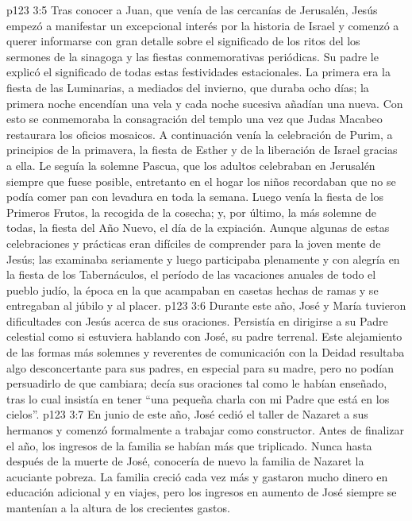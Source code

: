\vs p123 3:5 \pc Tras conocer a Juan, que venía de las cercanías de Jerusalén, Jesús empezó a manifestar un excepcional interés por la historia de Israel y comenzó a querer informarse con gran detalle sobre el significado de los ritos del  los sermones de la sinagoga y las fiestas conmemorativas periódicas. Su padre le explicó el significado de todas estas festividades estacionales. La primera era la fiesta de las Luminarias, a mediados del invierno, que duraba ocho días; la primera noche encendían una vela y cada noche sucesiva añadían una nueva. Con esto se conmemoraba la consagración del templo una vez que Judas Macabeo restaurara los oficios mosaicos. A continuación venía la celebración de Purim, a principios de la primavera, la fiesta de Esther y de la liberación de Israel gracias a ella. Le seguía la solemne Pascua, que los adultos celebraban en Jerusalén siempre que fuese posible, entretanto en el hogar los niños recordaban que no se podía comer pan con levadura en toda la semana. Luego venía la fiesta de los Primeros Frutos, la recogida de la cosecha; y, por último, la más solemne de todas, la fiesta del Año Nuevo, el día de la expiación. Aunque algunas de estas celebraciones y prácticas eran difíciles de comprender para la joven mente de Jesús; las examinaba seriamente y luego participaba plenamente y con alegría en la fiesta de los Tabernáculos, el período de las vacaciones anuales de todo el pueblo judío, la época en la que acampaban en casetas hechas de ramas y se entregaban al júbilo y al placer.
\vs p123 3:6 \pc Durante este año, José y María tuvieron dificultades con Jesús acerca de sus oraciones. Persistía en dirigirse a su Padre celestial como si estuviera hablando con José, su padre terrenal. Este alejamiento de las formas más solemnes y reverentes de comunicación con la Deidad resultaba algo desconcertante para sus padres, en especial para su madre, pero no podían persuadirlo de que cambiara; decía sus oraciones tal como le habían enseñado, tras lo cual insistía en tener “una pequeña charla con mi Padre que está en los cielos”.
\vs p123 3:7 En junio de este año, José cedió el taller de Nazaret a sus hermanos y comenzó formalmente a trabajar como constructor. Antes de finalizar el año, los ingresos de la familia se habían más que triplicado. Nunca hasta después de la muerte de José, conocería de nuevo la familia de Nazaret la acuciante pobreza. La familia creció cada vez más y gastaron mucho dinero en educación adicional y en viajes, pero los ingresos en aumento de José siempre se mantenían a la altura de los crecientes gastos.
